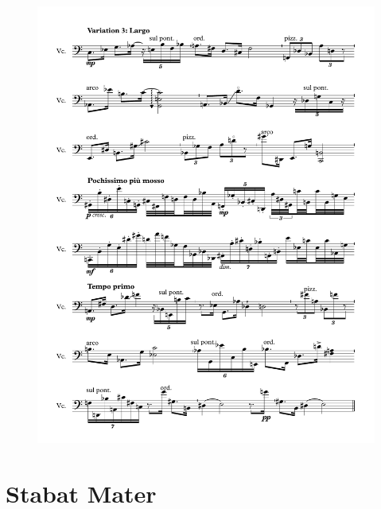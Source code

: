 \begin{figure}[htbp]
    \centering
	\includegraphics[width=6.5in]{figures/Variations_3.pdf}
\end{figure}

\chapter{Stabat Mater}

